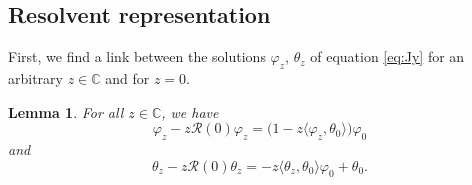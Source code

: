\documentclass[pdftex]{sigma}%
\numberwithin{equation}{section}
\newtheorem{Lemma}[Theorem]{Lemma}
\begin{document}
\subsection{Resolvent representation}\label{section3.2}

First, we find a link between the solutions $\varphi_{z}$, $\theta_{z}$ of equation \eqref{eq:Jy} for an arbitrary $z \in {\mathbb C}$ and for $z=0$.

\begin{Lemma}\label{PQ}
 For all $z \in {\mathbb C}$, we have
 \begin{equation}
\varphi_{z} - z {\mathcal R}(0) \varphi_{z}=\big( 1-z \langle \varphi_{z}, \theta_{0}\rangle \big) \varphi_{0}
\label{eq:PP1}\end{equation}
and
 \begin{equation}
\theta_{z} - z {\mathcal R}(0) \theta_{z}= - z \langle \theta_{z}, \theta_{0} \rangle \varphi_{0} + \theta_{0}.
\label{eq:QQ}\end{equation}
 \end{Lemma}
\end{document}
